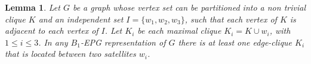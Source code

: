\documentclass[9pt]{entcs}
\newtheorem{lema}{Lemma}[section]
\begin{document}


\begin{lema}\label{coro:3Cliques1EdgeClique}
Let $G$ be a graph whose vertex set  can be partitioned into a non trivial clique $K$ and an independent set $I=\{w_1,w_2,w_3\}$, such that each vertex of $K$ is adjacent to each vertex of $I$. Let $K_i$ be each maximal clique  $K_i = K \cup w_i$, with $1 \leq i \leq 3$.
In any $B_1$-EPG representation of $G$ there is at least one edge-clique $K_i$ that is located between two satellites $w_i$.
\end{lema}
\end{document}
